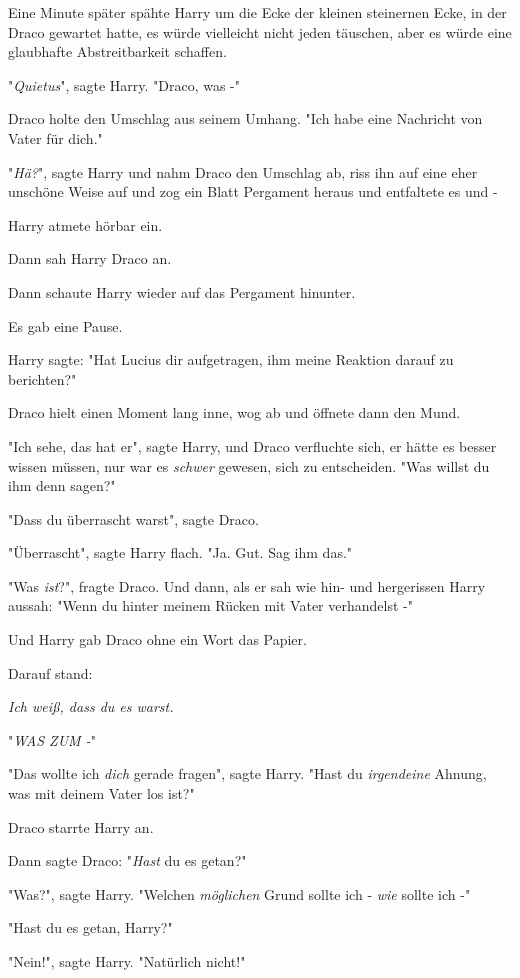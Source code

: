 {Eine Minute später spähte Harry um die Ecke der kleinen steinernen Ecke, in der Draco gewartet hatte, es würde vielleicht nicht jeden täuschen, aber es würde eine glaubhafte Abstreitbarkeit schaffen.

"\emph{Quietus}", sagte Harry. "Draco, was -"

Draco holte den Umschlag aus seinem Umhang. "Ich habe eine Nachricht von Vater für dich."

"\emph{Hä?}", sagte Harry und nahm Draco den Umschlag ab, riss ihn auf eine eher unschöne Weise auf und zog ein Blatt Pergament heraus und entfaltete es und -

Harry atmete hörbar ein.

Dann sah Harry Draco an.

Dann schaute Harry wieder auf das Pergament hinunter.

Es gab eine Pause.

Harry sagte: "Hat Lucius dir aufgetragen, ihm meine Reaktion darauf zu berichten?"

Draco hielt einen Moment lang inne, wog ab und öffnete dann den Mund.

"Ich sehe, das hat er", sagte Harry, und Draco verfluchte sich, er hätte es besser wissen müssen, nur war es \emph{schwer} gewesen, sich zu entscheiden. "Was willst du ihm denn sagen?"

"Dass du überrascht warst", sagte Draco.

"Überrascht", sagte Harry flach. "Ja. Gut. Sag ihm das."

"Was \emph{ist}?", fragte Draco. Und dann, als er sah wie hin- und hergerissen Harry aussah: "Wenn du hinter meinem Rücken mit Vater verhandelst -"

Und Harry gab Draco ohne ein Wort das Papier.

Darauf stand:

\emph{Ich weiß, dass du es warst.}

"\emph{WAS ZUM -}"

"Das wollte ich \emph{dich} gerade fragen", sagte Harry. "Hast du \emph{irgendeine} Ahnung, was mit deinem Vater los ist?"

Draco starrte Harry an.

Dann sagte Draco: "\emph{Hast} du es getan?"

"Was?", sagte Harry. "Welchen \emph{möglichen} Grund sollte ich - \emph{wie} sollte ich -"

"Hast du es getan, Harry?"

"Nein!", sagte Harry. "Natürlich nicht!"

}

